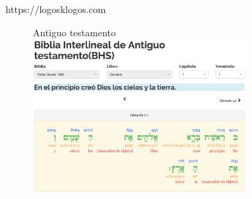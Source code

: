 \documentclass[11pt]{beamer}
\begin{document}
\begin{frame}{https://logosklogos.com}
  \begin{figure}{Antiguo testamento}
    \includegraphics[width=3.25in]{logos-hebreo.png}
  \end{figure}
\end{frame}
\end{document}
